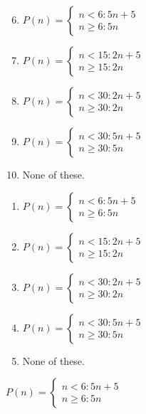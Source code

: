 \ifacteven
	\begin{enumerate}[label=\textbf{\Alph*.},itemsep=\fill,align=left]
		\setcounter{enumii}{5}
		\item $P(n)=\left\{\begin{array}{l}n<6: 5n+5\\n\geq6: 5n\end{array}\right.$ %
		\item $P(n)=\left\{\begin{array}{l}n<15: 2n+5\\n\geq15: 2n \end{array}\right.$
		\item $P(n)=\left\{\begin{array}{l}n<30: 2n+5\\n\geq30: 2n \end{array}\right.$
		\addtocounter{enumii}{1}
		\item $P(n)=\left\{\begin{array}{l}n<30: 5n+5\\n\geq30: 5n \end{array}\right.$
		\item None of these. 
	\end{enumerate}
\else
\fi

\ifactodd
	\begin{enumerate}[label=\textbf{\Alph*.},itemsep=\fill,align=left]
		\item $P(n)=\left\{\begin{array}{l}n<6: 5n+5\\n\geq6: 5n\end{array}\right.$ %
		\item $P(n)=\left\{\begin{array}{l}n<15: 2n+5\\n\geq15: 2n \end{array}\right.$
		\item $P(n)=\left\{\begin{array}{l}n<30: 2n+5\\n\geq30: 2n \end{array}\right.$
		\item $P(n)=\left\{\begin{array}{l}n<30: 5n+5\\n\geq30: 5n \end{array}\right.$
		\item None of these. 
	\end{enumerate}
\else
\fi

\ifgridin
 $P(n)=\left\{\begin{array}{l}n<6: 5n+5\\n\geq6: 5n\end{array}\right.$ %
		
\else
\fi

